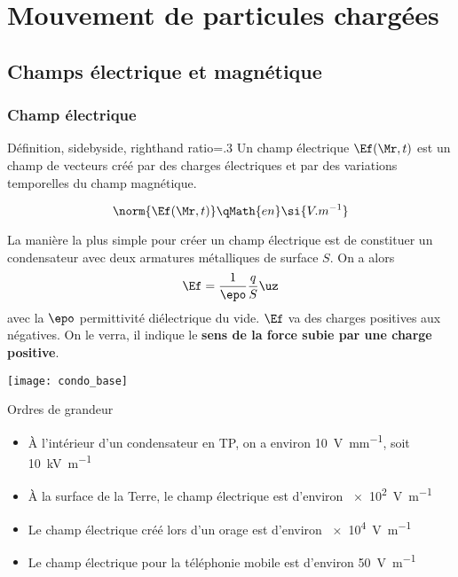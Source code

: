 \documentclass[../main/main.tex]{subfiles}
\begin{document}
\setcounter{chapter}{4}

\chapter{Mouvement de particules charg\'ees}

\section{Champs électrique et magnétique}
\subsection{Champ électrique}
\begin{tdefi}{Définition, sidebyside, righthand ratio=.3}
    Un champ électrique $\Ef(\Mr,t)$ est un champ de vecteurs créé par des
    charges électriques et par des variations temporelles du champ magnétique.
    \bigbreak
    \tcblower
    \begin{center}
        \color{deficol}
        \bfseries
    \end{center}
    \[
        \norm{\Ef(\Mr,t)} \qMath{en} \si{V.m^{-1}}
    \]
\end{tdefi}

\begin{minipage}{0.65\linewidth}
    La manière la plus simple pour créer un champ électrique est de constituer un
    condensateur avec deux armatures métalliques de surface $S$. On a alors
    \[\Ef = \frac{1}{\epo} \frac{q}{S}\uz\]
    avec la $\epo$ permittivité diélectrique du vide. \bigbreak
    $\Ef$ va des charges positives aux négatives. On le verra, il indique le
    \textbf{sens de la force subie par une charge positive}.
\end{minipage}
\hfill
\begin{minipage}{0.33\linewidth}
    \begin{center}
        \texttt{[image: condo\_base]}
        \captionsetup{justification=centering}
        \label{fig:condo}
    \end{center}
\end{minipage}

\begin{rexem}{Ordres de grandeur}
    \begin{itemize}[label=$\diamond$]
        \item À l'intérieur d'un condensateur en TP, on a environ
            \SI{10}{V.mm^{-1}}, soit \SI{10}{kV.m^{-1}}
        \item À la surface de la Terre, le champ électrique est d'environ
            \SI{e2}{V.m^{-1}}
        \item Le champ électrique créé lors d'un orage est d'environ
            \SI{e4}{V.m^{-1}}
        \item Le champ électrique pour la téléphonie mobile est d'environ
            \SI{50}{V.m^{-1}}
    \end{itemize}
\end{rexem}
\end{document}
